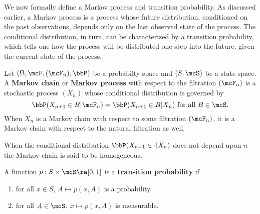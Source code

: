 \documentclass{report}
\begin{document}
\begin{example}
\begin{comment}
The more I think about this though, the more Talib doesn't make sense.   For the most part the turkey is correct.  He does have a high chance of living throughout the day.  The day that this does not occur does have a small probabilty of occuring.  It also has severe consequences.  Really, it is the consequences that are devestating.  One must have a loss function to measure how devastating these consequences are.  Relating this to finance, the turkey needs to have some sort of insurance or financial instrument he is using to make this analogy valid.  Even then, if he has calculated his probability correctly, it shouldn't matter.  One wants to include extreme events because they affect the price of an assset.  With CDO's extreme events should have made these assets much cheaper relative to the alleged return.
\end{remark}
\end{comment}

\end{example}

We now formally define a Markov process and transition probability.  As discussed earlier, a Markov process is a process whose future distribution, conditioned on the past observations, depends only on the last observed state of the process.  The conditional distribution, in turn, can be characterized by a transition probability, which tells one how the process will be distributed one step into the future, given the current state of the process.

\begin{definition}
Let $(\Omega, \mcF, (\mcF_n), \bbP)$ be a probabilty space and $(S,\mcS)$ be a state space.  A  \textbf{Markov chain} or  \textbf{Markov process} with respect to the filtration $(\mcF_n)$ is a stochastic process $(X_n)$ whose conditional distribution is governed by
\[
\bbP(X_{n+1} \in B | \mcF_n) = \bbP(X_{n+1} \in B | X_n) \textmd{ for all } B \in \mcS.
\]
When $X_n$ is a Markov chain with respect to some filtration $(\mcF_n)$, it is a Markov chain with respect to the natural filtration as well.

When the conditional distribution $\bbP(X_{n+1} \in \cdot | X_n)$ does not depend upon $n$ the Markov chain is said to be  homogeneous.
\end{definition}

\begin{definition}
A function $p:S \times \mcS \ra [0,1]$ is a  \textbf{transition probability} if
\begin{enumerate}
\item for all $x \in S$, $A \mapsto p(x,A)$ is a probability,
\item for all $A \in \mcS$, $x \mapsto p(x,A)$ is measurable.
\end{enumerate}
\end{definition}
\end{document}
